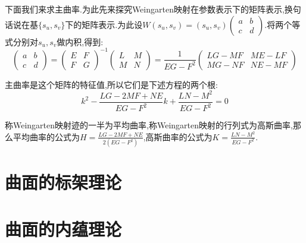 下面我们来求主曲率.为此先来探究Weingarten映射在参数表示下的矩阵表示,换句话说在基$\{s_u,s_v\}$下的矩阵表示.为此设$W(s_u,s_v)=(s_u,s_v)\left(\begin{array}{cc} a&b\\ c&d\end{array}\right)$.将两个等式分别对$s_u,s_v$做内积,得到:
$$\left(\begin{array}{cc} a&b\\ c&d\end{array}\right)=\left(\begin{array}{cc} E&F\\ F&G\end{array}\right)^{-1}\left(\begin{array}{cc} L&M\\ M&N\end{array}\right)=\frac{1}{EG-F^2}\left(\begin{array}{cc} LG-MF&ME-LF\\ MG-NF&NE-MF\end{array}\right)$$

主曲率是这个矩阵的特征值,所以它们是下述方程的两个根:
$$k^2-\frac{LG-2MF+NE}{EG-F^2}k+\frac{LN-M^2}{EG-F^2}=0$$

称Weingarten映射迹的一半为平均曲率,称Weingarten映射的行列式为高斯曲率,那么平均曲率的公式为$H=\frac{LG-2MF+NE}{2(EG-F^2)}$,高斯曲率的公式为$K=\frac{LN-M^2}{EG-F^2}$.

\section{曲面的标架理论}
\section{曲面的内蕴理论}


